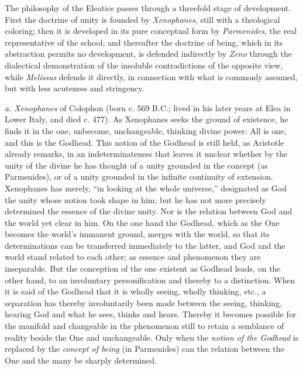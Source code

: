 The philosophy of the Eleatics passes through a threefold stage of development. First the doctrine of unity is founded by \emph{Xenophanes}, still with a theological coloring; then it is developed in its
pure conceptual form by \emph{Parmenides}, the real representative of the school; and thereafter the doctrine of being, which in its abstraction permits no development, is defended indirectly by \emph{Zeno}
through the dialectical demonstration of the insoluble contradictions
of the opposite view, while \emph{Melissus} defends it directly,
in connection with what is commonly assumed, but with less
acuteness and stringency.

\textit{a.} \emph{Xenophanes} of Colophon (born c. 569 B.C.;
lived in his later years at Elea in Lower Italy, and died c. 477). As
Xenophanes seeks the ground of existence, he finds it in the
one, unbecome, unchangeable, thinking divine power: All
is one, and this is the Godhead. This notion of the Godhead is still held, as Aristotle already remarks, in
an indeterminateness that leaves it unclear whether by the unity of the divine he has thought of a unity grounded in the concept
(as Parmenides), or of a unity grounded in the infinite continuity of extension. Xenophanes has merely, ``in
looking at the whole universe,'' designated as God the unity whose notion
took shape in him; but he has not more precisely determined
the essence of the divine unity. Nor is the relation
between God and the world yet clear in him. On the one
hand the Godhead, which as the One becomes the world's
immanent ground, merges with the world, so that its determinations
can be transferred immediately to the latter, and God and the world
stand related to each other; as essence and phenomenon they are inseparable.
But the conception of the one existent as Godhead leads, on the
other hand, to an involuntary personification and thereby to a
distinction. When it is said of the Godhead that it is wholly
seeing, wholly thinking, etc., a separation has thereby involuntarily
been made between the seeing, thinking, hearing
God and what he sees, thinks and hears. Thereby it becomes
possible for the manifold and changeable in the phenomenon
still to retain a semblance of reality beside the One
and unchangeable. Only when the \emph{notion of the Godhead} is replaced by the \emph{concept of being} (in Parmenides)
can the relation between the One and the many be sharply
determined.

